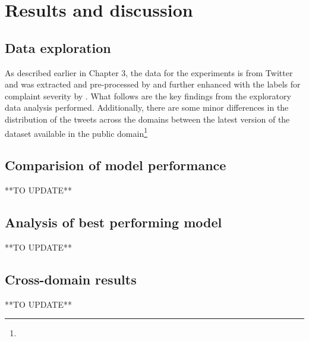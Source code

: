 \chapter{Results and discussion}

\section{Data exploration}
As described earlier in Chapter 3, the data for the experiments is from Twitter and was extracted and pre-processed by \cite{preotiuc-pietro_automatically_2019} and further enhanced with the labels for complaint severity by \cite{jinModelingSeverityComplaints2021}. What follows are the key findings from the exploratory data analysis performed. Additionally, there are some minor differences in the distribution of the tweets across the domains between the latest version of the dataset available in the public domain\footnote{}

\section{Comparision of model performance}
**TO UPDATE**

\section{Analysis of best performing model}
**TO UPDATE**

\section{Cross-domain results}
**TO UPDATE**